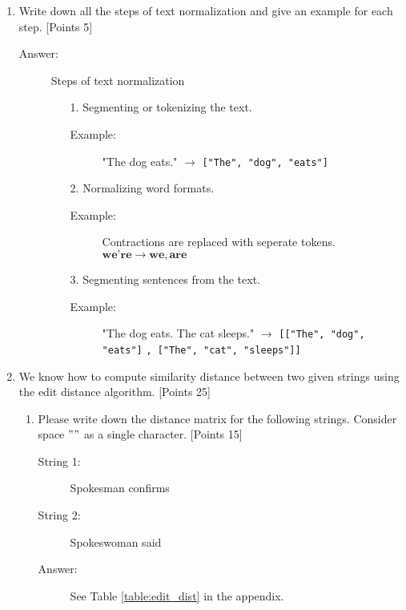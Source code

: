 \documentclass[12pt]{article}
\begin{document}
\begin{enumerate}
    \item Write down all the steps of text normalization and give an example for
          each step. [Points 5]
          \begin{description}
              \item[Answer:] Steps of text normalization
                  \begin{enumerate}
                      \item[1.] Segmenting or tokenizing the text.
                          \begin{description}
                              \item[Example:] "The dog eats." $\to$ \verb/["The", "dog", "eats"]/
                          \end{description}
                      \item[2.] Normalizing word formats.
                          \begin{description}
                              \item[Example:] Contractions are replaced with
                                  seperate tokens. $\textbf{we're} \to
                                      \textbf{we}, \textbf{are}$
                          \end{description}
                      \item[3.] Segmenting sentences from the text.
                          \begin{description}
                              \item[Example:] "The dog eats. The cat sleeps."
                                  $\to$ \verb/[["The", "dog", "eats"]/
                                  \verb/, ["The", "cat", "sleeps"]]/
                          \end{description}
                  \end{enumerate}
          \end{description}

    \item We know how to compute similarity distance between two given strings
          using the edit distance algorithm. [Points 25]
          \begin{enumerate}
              \item Please write down the distance matrix for the following
                    strings. Consider space $" "$ as a single character. [Points
                            15]
                    \begin{description}
                        \item[String 1:] Spokesman confirms
                        \item[String 2:] Spokeswoman said
                        \item[Answer:] See Table \ref{table:edit_dist} in the
                            appendix.
                    \end{description}


\end{enumerate}
\end{enumerate}
\end{document}
